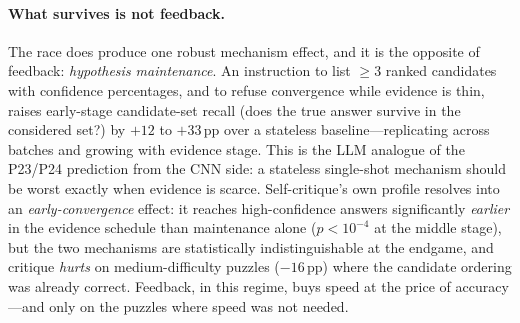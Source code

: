 \documentclass[10pt]{article}
\begin{document}
\paragraph{What survives is not feedback.}
The race does produce one robust mechanism effect, and it is the opposite
of feedback: \emph{hypothesis maintenance}. An instruction to list $\ge 3$
ranked candidates with confidence percentages, and to refuse convergence
while evidence is thin, raises early-stage candidate-set recall (does the
true answer survive in the considered set?) by $+12$ to $+33$\,pp over a
stateless baseline---replicating across batches and growing with evidence
stage. This is the LLM analogue of the P23/P24 prediction from the CNN
side: a stateless single-shot mechanism should be worst exactly when
evidence is scarce. Self-critique's own profile resolves into an
\emph{early-convergence} effect: it reaches high-confidence answers
significantly \emph{earlier} in the evidence schedule than maintenance
alone ($p < 10^{-4}$ at the middle stage), but the two mechanisms are
statistically indistinguishable at the endgame, and critique \emph{hurts}
on medium-difficulty puzzles ($-16$\,pp) where the candidate ordering was
already correct. Feedback, in this regime, buys speed at the price of
accuracy---and only on the puzzles where speed was not needed.
\end{document}
